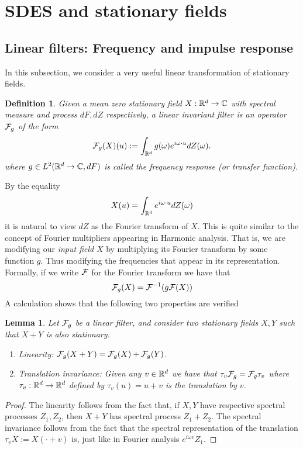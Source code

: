 \documentclass[12pt]{article}
\newtheorem{lemma}{Lemma}
\newtheorem{definition}{Definition}
\begin{document}
\section{SDES and stationary fields}
\subsection{Linear filters: Frequency and impulse response}
In this subsection, we consider a very useful linear transformation of stationary fields.
\begin{definition}\label{frequency response def}
	Given a mean zero stationary field $X:{\mathbb R}^d\to\mathbb{C}$ with spectral measure and process  $dF,dZ$ respectively, a \emph{linear invariant filter} is an operator $\mathcal{F}_g$ of the form
	\begin{equation*}
		\mathcal{F}_g(X)(u):= \int_{{\mathbb R}^d} g(\omega)e^{i\omega\cdot u} dZ(\omega).
	\end{equation*}
	where $g \in L^2({\mathbb R}^d\to\mathbb{C},dF)$ is called the \emph{frequency response} (or \emph{transfer function}).
\end{definition}
By the equality
\begin{equation*}
	X(u)=\int_{{\mathbb R}^d}e^{i\omega\cdot u}dZ(\omega)
\end{equation*}
it is natural to view $dZ$ as the Fourier transform of $X$. This is quite similar to the concept of Fourier multipliers appearing in Harmonic analysis. That is, we are modifying our \emph{input field} $X$ by multiplying its Fourier transform by some function $g$. Thus modifying the frequencies that appear in its representation. Formally, if we write  $\mathcal{F}$ for the Fourier transform we have that
\begin{equation}\label{formal}
	\mathcal{F}_g(X)=\mathcal{F}^{-1}(g\mathcal{F}(X))
\end{equation}
A calculation shows that the following two properties are verified
\begin{lemma}
	Let $\mathcal{F}_g$ be a linear filter, and consider two stationary fields $X, Y$ such that $X+Y$ is also stationary.
	\begin{enumerate}
		\item Linearity: $\mathcal{F}_g(X+Y)=\mathcal{F}_g(X)+\mathcal{F}_g(Y)$.
		\item Translation invariance: Given any $v\in {\mathbb R}^d$ we have that  $\tau_v\mathcal{F}_g= \mathcal{F}_g\tau_v$ where $\tau_v:{\mathbb R}^d\to {\mathbb R}^d$ defined by $\tau_v(u)=u+v$ is the translation by $v$.
	\end{enumerate}
\end{lemma}
\begin{proof}
	The linearity follows from the fact that, if $X, Y$ have respective spectral processes  $Z_1, Z_2$, then  $X+Y$ has spectral process  $Z_1+Z_2$. The spectral invariance follows from the fact that the spectral representation of  the translation $\tau_v X:= X(\cdot +v)$ is, just like in Fourier analysis $e^{i\omega v}Z_1$.
\end{proof}
\end{document}
